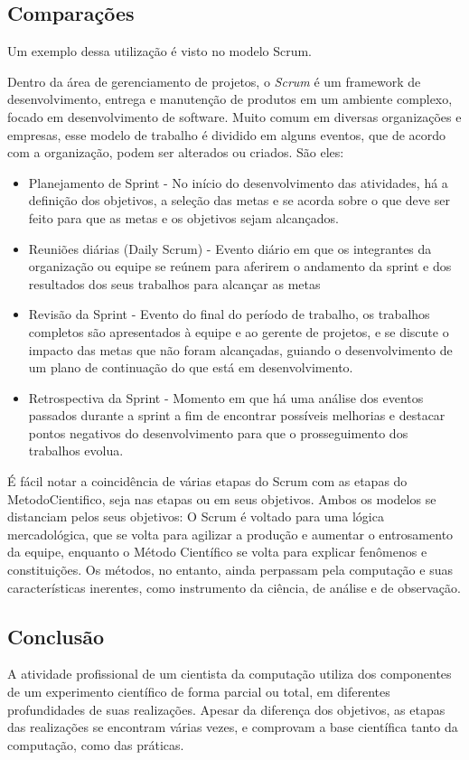 \subsection{Comparações}
Um exemplo dessa utilização é visto no modelo Scrum.

Dentro da área de gerenciamento de projetos, o \textit{Scrum} é um framework de desenvolvimento, entrega e manutenção de produtos em um ambiente complexo, focado em desenvolvimento de software. Muito comum em diversas organizações e empresas, esse modelo de trabalho é dividido em alguns eventos, que de acordo com a organização, podem ser alterados ou criados. São eles:

\begin{itemize}
    \item Planejamento de Sprint - No início do desenvolvimento das atividades, há a definição dos objetivos, a seleção das metas e se acorda sobre o que deve ser feito para que as metas e os objetivos sejam alcançados.
    \item Reuniões diárias (Daily Scrum) - Evento diário em que os integrantes da organização ou equipe se reúnem para aferirem o andamento da sprint e dos resultados dos seus trabalhos para alcançar as metas
    \item Revisão da Sprint - Evento do final do período de trabalho, os trabalhos completos são apresentados à  equipe e ao gerente de projetos, e se discute o impacto das metas que não foram alcançadas, guiando o desenvolvimento de um plano de continuação do que está em desenvolvimento.
    \item Retrospectiva da Sprint - Momento em que há uma análise dos eventos passados durante a sprint a fim de encontrar possíveis melhorias e destacar pontos negativos do desenvolvimento para que o prosseguimento dos trabalhos evolua.
\end{itemize}

É fácil notar a coincidência de várias etapas do Scrum com as etapas do \gls{MetodoCientifico}, seja nas etapas ou em seus objetivos. Ambos os modelos se distanciam pelos seus objetivos: O Scrum é voltado para uma lógica mercadológica, que se volta para agilizar a produção e aumentar o entrosamento da equipe, enquanto o Método Científico se volta para explicar fenômenos e constituições. Os métodos, no entanto, ainda perpassam pela computação e suas características inerentes, como instrumento da ciência, de análise e de observação.

\subsection{Conclusão}
A atividade profissional de um cientista da computação utiliza dos componentes de um experimento científico de forma parcial ou total, em diferentes profundidades de suas realizações. Apesar da diferença dos objetivos, as etapas das realizações se encontram várias vezes, e comprovam a base científica tanto da computação, como das práticas.